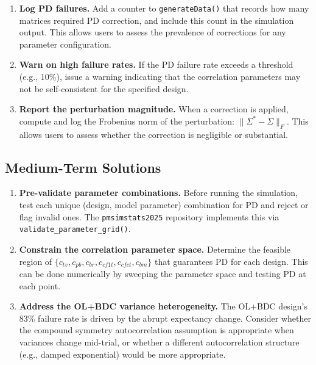 \documentclass[11pt]{article}
\begin{document}
\begin{enumerate}
\item \textbf{Log PD failures.} Add a counter to
  \texttt{generateData()} that records how many matrices
  required PD correction, and include this count in the
  simulation output. This allows users to assess the
  prevalence of corrections for any parameter configuration.

\item \textbf{Warn on high failure rates.} If the PD failure
  rate exceeds a threshold (e.g., 10\%), issue a warning
  indicating that the correlation parameters may not be
  self-consistent for the specified design.

\item \textbf{Report the perturbation magnitude.} When a
  correction is applied, compute and log the Frobenius norm of
  the perturbation:
  $\|\Sigma^* - \Sigma\|_F$. This allows users to assess
  whether the correction is negligible or substantial.
\end{enumerate}

\subsection{Medium-Term Solutions}

\begin{enumerate}
\item \textbf{Pre-validate parameter combinations.} Before
  running the simulation, test each unique (design, model
  parameter) combination for PD and reject or flag invalid
  ones. The \texttt{pmsimstats2025} repository implements
  this via \texttt{validate\_parameter\_grid()}.

\item \textbf{Constrain the correlation parameter space.}
  Determine the feasible region of $\{c_{tv}, c_{pb}, c_{br},
  c_{cf1t}, c_{cfct}, c_{bm}\}$ that guarantees PD for each
  design. This can be done numerically by sweeping the
  parameter space and testing PD at each point.

\item \textbf{Address the OL+BDC variance heterogeneity.}
  The OL+BDC design's 83\% failure rate is driven by the
  abrupt expectancy change. Consider whether the compound
  symmetry autocorrelation assumption is appropriate when
  variances change mid-trial, or whether a different
  autocorrelation structure (e.g., damped exponential) would
  be more appropriate.
\end{enumerate}
\end{document}
